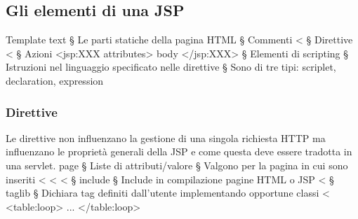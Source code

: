 \begin{itemize}
\subsection{Gli elementi di una JSP}
Template text
§ Le parti statiche della pagina HTML
§ Commenti
<%
§ Direttive
<%
§ Azioni
<jsp:XXX attributes> body </jsp:XXX>
§ Elementi di scripting
§ Istruzioni nel linguaggio specificato nelle direttive
§ Sono di tre tipi: scriplet, declaration, expression

\subsubsection{Direttive}
Le direttive non influenzano la gestione di una singola richiesta
HTTP ma influenzano le proprietà generali della JSP e come questa
deve essere tradotta in una servlet.
page
§ Liste di attributi/valore
§ Valgono per la pagina in cui sono inseriti
<%
<%
<%
§ include
§ Include in compilazione pagine HTML o JSP
<%
§ taglib
§ Dichiara tag definiti dall'utente implementando opportune classi
<%
<table:loop> ... </table:loop>


\end{itemize}
